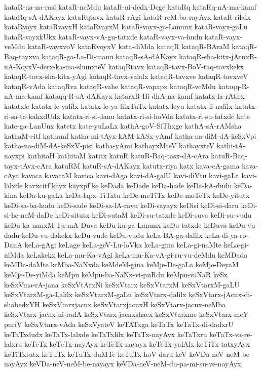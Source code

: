 {kataR-na-na-rasi
kataR-neMdu
kataR-ni-dedx-Dege
kataRq
kataRq-nA-ma-kamf
kataRq-sA-dAKayx
kataRqtavx
kataR-rAgi
kataR-reM-ba-rayAyx
kataR-rilalx
kataRvayx
kataRvayxH
kataRvayxM
kataR-vayx-ga-Lanunx
kataR-vayx-gaLu
kataR-vayxkUkx
kataR-vayx-vA-gu-tatxde
kataR-vayx-va-hudu
kataR-vayx-veMdu
kataR-vayxvoV
kataRvoyxV
kata-diMda
kataqR
kataqR-BAvaM
kataqR-Baq-tayxva
kataqR-ga-La-Di-manu
kataqR-sA-dAKayx
kataqR-sha-kitx-jAcnxR-nA-KoyxV-derx-ka-ma-shunxteV
kataqRtavx
kataqR-tavx-BoV-taq-tavxkekx
kataqR-tavx-sha-kitx-yAgi
kataqR-tavx-valalx
kataqR-tavxve
kataqR-tavxveV
kataqR-vAda
kataqRva
kataqR-vahe
kataqR-vapapx
kataqR-veMdu
kataqq-R-nA-ma-kamf
kataqq-R-sA-dAKayx
katarxR-Bi-dhA-na-kamf
katatx-la-rAtirx
katatxle
katatx-le-yalilx
katatx-le-ya-lilxTuTx
katatx-leyu
katatx-li-nalilx
katatx-ri-sa-ta-kakxdUdx
katatx-ri-si-danu
katatx-ri-si-hoVda
katatx-ri-su-tatxde
kate
kate-ga-LanUnx
katetx
kate-yuLaLx
kathA-goV-SiThxge
kathA-sA-rAMsha
kathaM-citf
kathamf
katha-mi-tAyx-kAM-kASx-yAmf
katha-na-diM-dA-keSxVpi
katha-na-diM-dA-keSxV-pisi
katha-yAmi
kathayxMteV
kathayxteV
kathi-tA-nayxpi
kathitaH
kathitaM
katitx
katuR
katuR-Baq-tasx-dA-cAra
katuR-Baq-tayx-tAvx-cAra
katuRM
katuR-sA-dAKayx
katutx-riya
katx
kava-cA-gama
kava-cAya
kavaca
kavacaM
kavica
kavi-dAga
kavi-dA-galU
kavi-diVtu
kavi-gaLa
kavi-lalxde
kavxcitf
kayx
kayxpf
ke
keDada
keDade
keDa-hade
keDa-kA-dudu
keDa-kina
keDa-ku-gaLa
keDa-lapx-TiTxtu
keDe-meTiTx
keDe-moTeTx
keDe-yitutx
keDi-sa-ba-hudu
keDi-sade
keDi-sa-lA-ravu
keDi-sayayx
keDisi
keDi-si-daru
keDi-si-he-neM-daDe
keDi-situtx
keDi-sutaM
keDi-su-tatxde
keDi-suva
keDi-su-vudu
keDu-ka-nunxM-Tu-mA-Duva
keDu-ku-ga-Lanunx
keDu-tatxde
keDuva
keDu-vu-dadu
keDu-vu-dakekx
keDu-vude
keDu-vudu
keLa-BA-ga-dalilx
keLa-di-ya-ro-DanA
keLa-gAgi
keLage
keLa-geV-Lu-loVka
keLa-gina
keLa-gi-naMte
keLa-gi-niMda
keLakekx
keLa-mu-Ka-vAgi
keLa-mu-Ka-vA-gi-ru-vu-deMdu
keMDada
keMDa-daMte
keMba-NaNxda
keMdeM-gina
keMje-De-gaLa
keMje-DeyaM
keMje-De-yiMda
keMpu
keMpu-ba-NaNx-vi-puRdu
keMpu-vaNaR
keSx
keSxVma-rA-jana
keSxVtArxNi
keSxVtarx
keSxVtarxM
keSxVtarxM-gaLU
keSxVtarxM-ga-Lalilx
keSxVtarxM-gaLu
keSxVtarx-dalilx
keSxVtarx-jAcnx-di-shabedxYH
keSxVtarxjacnx
keSxVtarxjacnxH
keSxVtarx-jacnx-neMba
keSxVtarx-jacnx-ni-radA
keSxVtarx-jacnxshacx
keSxVtarxme
keSxVtarx-meY-puriV
keSxVtarx-vAda
keSxVyateV
keTATxga
keTaTx
keTaTx-di-dadxrU
keTaTxdudx
keTaTx-lalxde
keTaTxlilx
keTaTx-nayAyx
keTaTxru
keTaTx-va-re-lalxru
keTeTx
keTeTx-nayAyx
keTeTx-nayayx
keTeTx-yalAlx
keTiTx-tatxyAyx
keTiTxtutx
keTuTx
keTuTx-duMTe
keTuTx-hoV-daru
keV
keVDa-neV-neM-be-nayAyx
keVDa-neV-neM-be-nayayx
keVDa-neV-neM-du-pa-mi-su-ve-nayAyx
}
